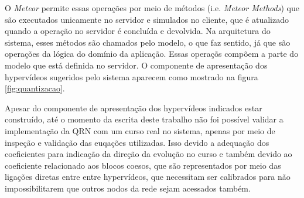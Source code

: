 O \textit{Meteor} permite essas operações por meio de métodos (i.e. \textit{Meteor Methods}) que são executados unicamente no servidor e simulados no cliente, que é atualizado quando a operação no servidor é concluída e devolvida. Na arquitetura do sistema, esses métodos são chamados pelo modelo, o que faz sentido, já que são operações da lógica do domínio da aplicação. Essas operaçõs compõem a parte do modelo que está definida no servidor. O componente de apresentação dos hypervídeos sugeridos pelo sistema aparecem como mostrado na figura \ref{fig:quantizacao}.

Apesar do componente de apresentação dos hypervídeos indicados estar construído, até o momento da escrita deste trabalho não foi possível validar a implementação da QRN com um curso real no sistema, apenas por meio de inspeção e validação das euqações utilizadas. Isso devido a adequação dos coeficientes para indicação da direção da evolução no curso e também devido ao coeficiente relacionado aos blocos coesos, que são representados por meio das ligações diretas entre entre hypervídeos, que necessitam ser calibrados para não impossibilitarem que outros nodos da rede sejam acessados também.
